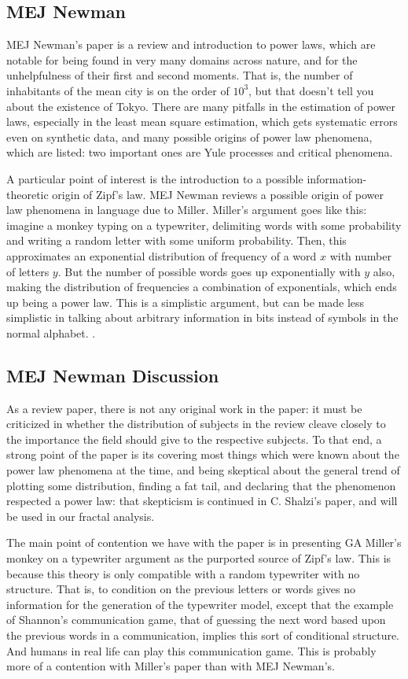 \documentclass[12pt]{article}
\begin{document}
\subsection{MEJ Newman}
MEJ Newman's paper is a review and introduction to power laws, which are notable for being found in very many domains across nature, and for the unhelpfulness of their first and second moments. That is, the number of inhabitants of the mean city is on the order of $10^3$, but that doesn't tell you about the existence of Tokyo. There are many pitfalls in the estimation of power laws, especially in the least mean square estimation, which gets systematic errors even on synthetic data, and many possible origins of power law phenomena, which are listed: two important ones are Yule processes and critical phenomena.

A particular point of interest is the introduction to a possible information-theoretic origin of Zipf's law. MEJ Newman reviews a possible origin of power law phenomena in language due to Miller. Miller's argument goes like this: imagine a monkey typing on a typewriter, delimiting words with some probability and writing a random letter with some uniform probability. Then, this approximates an exponential distribution of frequency of a word $x$ with number of letters $y$. But the number of possible words goes up exponentially with $y$ also, making the distribution of frequencies a combination of exponentials, which ends up being a power law. This is a simplistic argument, but can be made less simplistic in talking about arbitrary information in bits instead of symbols in the normal alphabet. %
. 
\subsection{MEJ Newman Discussion}

As a review paper, there is not any original work in the paper: it must be criticized in whether the distribution of subjects in the review cleave closely to the importance the field should give to the respective subjects. To that end, a strong point of the paper is its covering most things which were known about the power law phenomena at the time, and being skeptical about the general trend of plotting some distribution, finding a fat tail, and declaring that the phenomenon respected a power law: that skepticism is continued in C. Shalzi's paper, and will be used in our fractal analysis. %

The main point of contention we have with the paper is in presenting GA Miller's monkey on a typewriter argument as the purported source of Zipf's law. This is because this theory is only compatible with a random typewriter with no structure. That is, to condition on the previous letters or words gives no information for the generation of the typewriter model, except that the example of Shannon's communication game, that of guessing the next word based upon the previous words in a communication, implies this sort of conditional structure. And humans in real life can play this communication game. This is probably more of a contention with Miller's paper than with MEJ Newman's.
\end{document}
